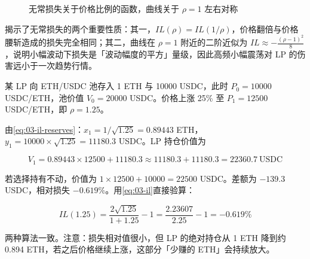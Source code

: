 \begin{figure}[htbp]
\centering
{}
\caption{无常损失关于价格比例的函数，曲线关于 $\rho=1$ 左右对称}\label{fig:03-il}
\end{figure}

揭示了无常损失的两个重要性质：其一，$IL(\rho) = IL(1/\rho)$，价格翻倍与价格腰斩造成的损失完全相同；其二，曲线在 $\rho=1$ 附近的二阶近似为 $IL\approx -\frac{(\rho-1)^2}{8}$，说明小幅波动下损失是「波动幅度的平方」量级，因此高频小幅震荡对 LP 的伤害远小于一次趋势行情。

\begin{example}[无常损失的数值验证]\label{ex:03-il}
某 LP 向 ETH/USDC 池存入 1 ETH 与 10000 USDC，此时 $P_0 = 10000$ USDC/ETH，池价值 $V_0 = 20000$ USDC。价格上涨 25\% 至 $P_1 = 12500$ USDC/ETH，即 $\rho = 1.25$。

由\cref{eq:03-il-reserves}：$x_1 = 1/\sqrt{1.25} = 0.89443$ ETH，$y_1 = 10000\times\sqrt{1.25} = 11180.3$ USDC。LP 持仓价值为

\[
  V_1 = 0.89443\times 12500 + 11180.3 \approx 11180.3 + 11180.3 = 22360.7\ \text{USDC}
\]

若选择持有不动，价值为 $1\times12500 + 10000 = 22500$ USDC。差额为 $-139.3$ USDC，相对损失 $-0.619\%$。用\cref{eq:03-il}直接验算：

\[
  IL(1.25) = \frac{2\sqrt{1.25}}{1+1.25}-1 = \frac{2.23607}{2.25}-1 = -0.619\%
\]

两种算法一致。注意：损失相对值很小，但 LP 的绝对持仓从 1 ETH 降到约 0.894 ETH，若之后价格继续上涨，这部分「少赚的 ETH」会持续放大。
\end{example}

